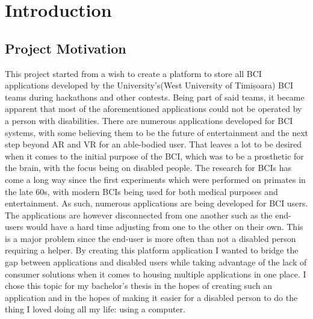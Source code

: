 \pagestyle{fancy}
\fancyhf{}%
\fancyhead[RO,LE]{\thepage}%
\fancyhead[RE]{\nouppercase{\leftmark}}%
\renewcommand{\headrulewidth}{0pt}%


\chapter{Introduction}\label{cap:intro}



\section{Project Motivation}\label{sect:motivation}
This project started from a wish to create a platform to store all BCI applications developed by the University's(West University of Timișoara) BCI teams during hackathons and other contests. Being part of said teams, it became apparent that most of the aforementioned applications could not be operated by a person with disabilities.
\vspace{\baselineskip}\newline
There are numerous applications developed for BCI systems, with some believing them to be the future of entertainment and the next step beyond AR and VR for an able-bodied user\cite{future_of_metaverse_BCI}. That leaves a lot to be desired when it comes to the initial purpose of the BCI, which was to be a prosthetic for the brain, with the focus being on disabled people. The research for BCIs has come a long way since the first experiments which were performed on primates in the late 60s\cite{Fetz_1969}, with modern BCIs being used for both medical purposes and entertainment. 
\vspace{\baselineskip}\newline
As such, numerous applications are being developed for BCI users. The applications are however disconnected from one another such as the end-users would have a hard time adjusting from one to the other on their own. This is a major problem since the end-user is more often than not a disabled person requiring a helper. By creating this platform application I wanted to bridge the gap between applications and disabled users while taking advantage of the lack of consumer solutions when it comes to housing multiple applications in one place. I chose this topic for my bachelor's thesis in the hopes of creating such an application and in the hopes of making it easier for a disabled person to do the thing I loved doing all my life: using a computer.



